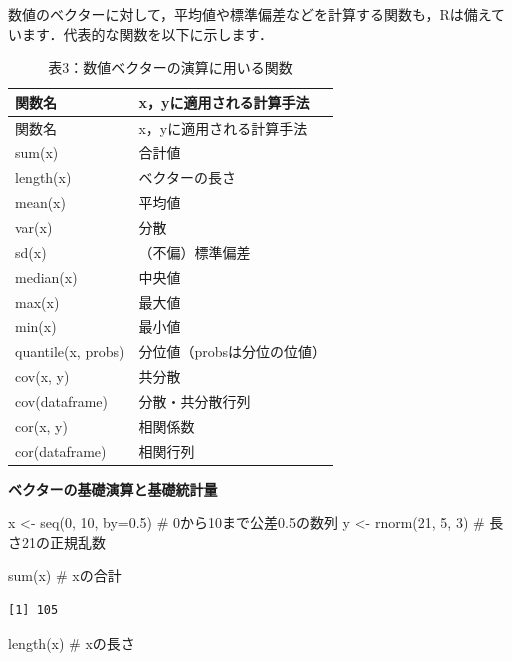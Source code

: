 \documentclass[
  letterpaper,
  DIV=11,
  numbers=noendperiod]{scrreprt}
\newenvironment{Shaded}{\begin{snugshade}}{\end{snugshade}}
\newcommand{\AttributeTok}[1]{\textcolor[rgb]{0.40,0.45,0.13}{#1}}
\newcommand{\CommentTok}[1]{\textcolor[rgb]{0.37,0.37,0.37}{#1}}
\newcommand{\DecValTok}[1]{\textcolor[rgb]{0.68,0.00,0.00}{#1}}
\newcommand{\FloatTok}[1]{\textcolor[rgb]{0.68,0.00,0.00}{#1}}
\newcommand{\FunctionTok}[1]{\textcolor[rgb]{0.28,0.35,0.67}{#1}}
\newcommand{\NormalTok}[1]{\textcolor[rgb]{0.00,0.23,0.31}{#1}}
\newcommand{\OtherTok}[1]{\textcolor[rgb]{0.00,0.23,0.31}{#1}}
\begin{document}
数値のベクターに対して，平均値や標準偏差などを計算する関数も，Rは備えています．代表的な関数を以下に示します．

\begin{longtable}[]{@{}ll@{}}
\caption{表3：数値ベクターの演算に用いる関数}\tabularnewline
\toprule()
関数名 & x，yに適用される計算手法 \\
\midrule()
\endfirsthead
\toprule()
関数名 & x，yに適用される計算手法 \\
\midrule()
\endhead
sum(x) & 合計値 \\
length(x) & ベクターの長さ \\
mean(x) & 平均値 \\
var(x) & 分散 \\
sd(x) & （不偏）標準偏差 \\
median(x) & 中央値 \\
max(x) & 最大値 \\
min(x) & 最小値 \\
quantile(x, probs) & 分位値（probsは分位の位値） \\
cov(x, y) & 共分散 \\
cov(dataframe) & 分散・共分散行列 \\
cor(x, y) & 相関係数 \\
cor(dataframe) & 相関行列 \\
\bottomrule()
\end{longtable}

\textbf{ベクターの基礎演算と基礎統計量}

\begin{Shaded}
\begin{Highlighting}[]
\NormalTok{x }\OtherTok{\textless{}{-}} \FunctionTok{seq}\NormalTok{(}\DecValTok{0}\NormalTok{, }\DecValTok{10}\NormalTok{, }\AttributeTok{by=}\FloatTok{0.5}\NormalTok{) }\CommentTok{\# 0から10まで公差0.5の数列}
\NormalTok{y }\OtherTok{\textless{}{-}} \FunctionTok{rnorm}\NormalTok{(}\DecValTok{21}\NormalTok{, }\DecValTok{5}\NormalTok{, }\DecValTok{3}\NormalTok{) }\CommentTok{\# 長さ21の正規乱数}

\FunctionTok{sum}\NormalTok{(x) }\CommentTok{\# xの合計}
\end{Highlighting}
\end{Shaded}

\begin{verbatim}
[1] 105
\end{verbatim}

\begin{Shaded}
\begin{Highlighting}[]
\FunctionTok{length}\NormalTok{(x) }\CommentTok{\# xの長さ}
\end{Highlighting}
\end{Shaded}
\end{document}
